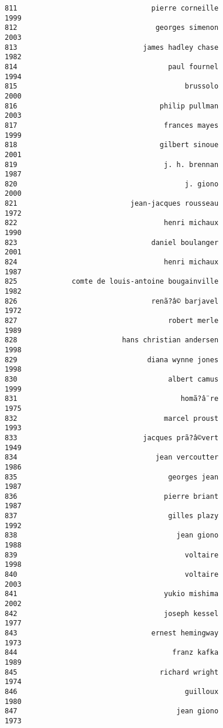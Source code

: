 \documentclass[
]{report}
\begin{document}
\begin{verbatim}
811                                pierre corneille                1999
812                                 georges simenon                2003
813                              james hadley chase                1982
814                                    paul fournel                1994
815                                        brussolo                2000
816                                  philip pullman                2003
817                                   frances mayes                1999
818                                  gilbert sinoue                2001
819                                   j. h. brennan                1987
820                                        j. giono                2000
821                           jean-jacques rousseau                1972
822                                   henri michaux                1990
823                                daniel boulanger                2001
824                                   henri michaux                1987
825             comte de louis-antoine bougainville                1982
826                                renã?â© barjavel                1972
827                                    robert merle                1989
828                         hans christian andersen                1998
829                               diana wynne jones                1998
830                                    albert camus                1999
831                                       homã?â¨re                1975
832                                   marcel proust                1993
833                              jacques prã?â©vert                1949
834                                 jean vercoutter                1986
835                                    georges jean                1987
836                                   pierre briant                1987
837                                    gilles plazy                1992
838                                      jean giono                1988
839                                        voltaire                1998
840                                        voltaire                2003
841                                   yukio mishima                2002
842                                   joseph kessel                1977
843                                ernest hemingway                1973
844                                     franz kafka                1989
845                                  richard wright                1974
846                                        guilloux                1980
847                                      jean giono                1973

\end{verbatim}
\end{document}
